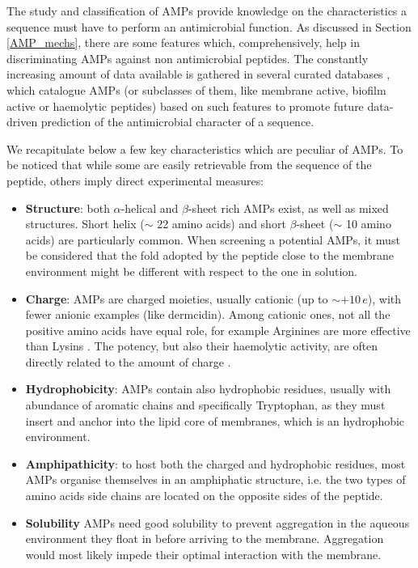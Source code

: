 The study and classification of AMPs provide knowledge on the characteristics a sequence must have to perform an antimicrobial function.
%
As discussed in Section \ref{AMP_mechs}, there are some features which, comprehensively, help in discriminating AMPs against non antimicrobial peptides. The constantly increasing amount of data available is gathered in several curated databases \citep{APD3,DBAASP2,dbAMP,antiBP2,amPEP}, which catalogue AMPs (or subclasses of them, like membrane active, biofilm active or haemolytic peptides) based on such features to promote future data-driven prediction of the antimicrobial character of a sequence.

We recapitulate below a few key characteristics which are peculiar of AMPs. To be noticed that while some are easily retrievable from the sequence of the peptide, others imply direct experimental measures:
\begin{itemize}
\item \textbf{Structure}: both $\alpha$-helical and $\beta$-sheet rich AMPs exist, as well as mixed structures. Short helix ($\sim$ 22 amino acids) and short $\beta$-sheet ($\sim$ 10 amino acids) are particularly common. When screening a potential AMPs, it must be considered that the fold adopted by the peptide close to the membrane environment might be different with respect to the one in solution.
%
\item \textbf{Charge}: AMPs are charged moieties, usually cationic (up to $\sim + 10\,e$), with fewer anionic examples (like dermcidin). Among cationic ones, not all the positive amino acids have equal role, for example Arginines are more effective than Lysins \citep{Chan2006}. The potency, but also their haemolytic activity, are often directly related to the amount of charge \citep{Jiang2011}.
%
\item \textbf{Hydrophobicity}: AMPs contain also hydrophobic residues, usually with abundance of aromatic chains and specifically Tryptophan, as they must insert and anchor into the lipid core of membranes, which is an hydrophobic environment.
%
\item \textbf{Amphipathicity}: to host both the charged and hydrophobic residues, most AMPs organise themselves in an amphiphatic structure, i.e. the two types of amino acids side chains are located on the opposite sides of the peptide.
%
\item \textbf{Solubility} AMPs need good solubility to prevent aggregation in the aqueous environment they float in before arriving to the membrane. Aggregation would most likely impede their optimal interaction with the membrane.
\end{itemize}

